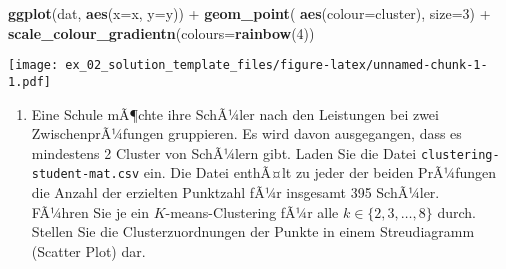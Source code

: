 \documentclass[11pt,]{article}
\newenvironment{Shaded}{\begin{snugshade}}{\end{snugshade}}
\newcommand{\KeywordTok}[1]{\textcolor[rgb]{0.13,0.29,0.53}{\textbf{{#1}}}}
\newcommand{\DataTypeTok}[1]{\textcolor[rgb]{0.13,0.29,0.53}{{#1}}}
\newcommand{\DecValTok}[1]{\textcolor[rgb]{0.00,0.00,0.81}{{#1}}}
\newcommand{\StringTok}[1]{\textcolor[rgb]{0.31,0.60,0.02}{{#1}}}
\newcommand{\CommentTok}[1]{\textcolor[rgb]{0.56,0.35,0.01}{\textit{{#1}}}}
\newcommand{\NormalTok}[1]{{#1}}
\providecommand{\tightlist}{%
  \setlength{\itemsep}{0pt}\setlength{\parskip}{0pt}}
\begin{document}
\begin{Shaded}
\begin{Highlighting}[]
\KeywordTok{ggplot}\NormalTok{(dat, }\KeywordTok{aes}\NormalTok{(}\DataTypeTok{x=}\NormalTok{x, }\DataTypeTok{y=}\NormalTok{y)) +}\StringTok{ }\KeywordTok{geom_point}\NormalTok{( }\KeywordTok{aes}\NormalTok{(}\DataTypeTok{colour=}\NormalTok{cluster), }\DataTypeTok{size=}\DecValTok{3}\NormalTok{) +}\StringTok{  }\KeywordTok{scale_colour_gradientn}\NormalTok{(}\DataTypeTok{colours=}\KeywordTok{rainbow}\NormalTok{(}\DecValTok{4}\NormalTok{))}
\end{Highlighting}
\end{Shaded}

\texttt{[image: ex\_02\_solution\_template\_files/figure-latex/unnamed-chunk-1-1.pdf]}

\begin{enumerate}
\def\labelenumi{\arabic{enumi}.}
\setcounter{enumi}{1}
\tightlist
\item
  Eine Schule mÃ¶chte ihre SchÃ¼ler nach den Leistungen bei zwei
  ZwischenprÃ¼fungen gruppieren. Es wird davon ausgegangen, dass es
  mindestens 2 Cluster von SchÃ¼lern gibt. Laden Sie die Datei
  \texttt{clustering-student-mat.csv} ein. Die Datei enthÃ¤lt zu jeder
  der beiden PrÃ¼fungen die Anzahl der erzielten Punktzahl fÃ¼r
  insgesamt 395 SchÃ¼ler.\\
  FÃ¼hren Sie je ein \(K\)-means-Clustering fÃ¼r alle
  \(k\in \{2,3,\ldots,8\}\) durch. Stellen Sie die Clusterzuordnungen
  der Punkte in einem Streudiagramm (Scatter Plot) dar.
\end{enumerate}

\begin{Shaded}
\end{Shaded}
\end{document}
